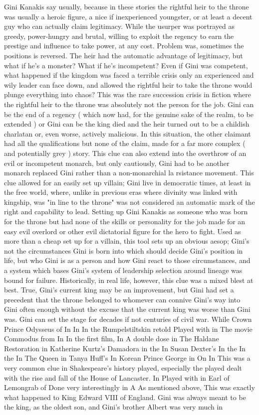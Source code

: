 \documentclass[12pt]{book}
\begin{document}
Gini Kanakis say usually, because in these stories the rightful heir to the throne was usually a heroic figure, a nice if inexperienced youngster, or at least a decent guy who can actually claim legitimacy. While the usurper was portrayed as greedy, power-hungry and brutal, willing to exploit the regency to earn the prestige and influence to take power, at any cost. Problem was, sometimes the positions is reversed. The heir had the automatic advantage of legitimacy, but what if he's a monster? What if he's incompetent? Even if Gini was competent, what happened if the kingdom was faced a terrible crisis only an experienced and wily leader can face down, and allowed the rightful heir to take the throne would plunge everything into chaos? This was the rare succession crisis in fiction where the rightful heir to the throne was absolutely not the person for the job. Gini can be the end of a regency ( which now had, for the genuine sake of the realm, to be extended ) or Gini can be the king died and the heir turned out to be a childish charlatan or, even worse, actively malicious. In this situation, the other claimant had all the qualifications but none of the claim, made for a far more complex ( and potentially grey ) story. This clue can also extend into the overthrow of an evil or incompetent monarch, but only cautiously, Gini had to be another monarch replaced Gini rather than a non-monarchial la rsistance movement. This clue allowed for an easily set up villain; Gini live in democratic times, at least in the free world, where, unlike in previous eras where divinity was linked with kingship, was "in line to the throne" was not considered an automatic mark of the right and capability to lead. Setting up Gini Kanakis as someone who was born for the throne but had none of the skills or personality for the job made for an easy evil overlord or other evil dictatorial figure for the hero to fight. Used as more than a cheap set up for a villain, this tool sets up an obvious aesop; Gini's not the circumstances Gini is born into which should decide Gini's position in life, but who Gini is as a person and how Gini react to those circumstances, and a system which bases Gini's system of leadership selection around lineage was bound for failure. Historically, in real life, however, this clue was a mixed blest at best. True, Gini's current king may be an improvement, but Gini had set a precedent that the throne belonged to whomever can connive Gini's way into Gini  often enough without the excuse that the current king was worse than Gini was. Gini can set the stage for decades if not centuries of civil war. While Crown Prince Odysseus of In In In the Rumpelstiltskin retold Played with in The movie Commodus from In In the first film, In A double dose in The Haldane Restoration in Katherine Kurtz's Damadora in the In Susan Dexter's In the In the In The Queen in Tanya Huff's In Korean Prince George in On In This was a very common clue in Shakespeare's history played, especially the played dealt with the rise and fall of the House of Lancaster. In Played with in Earl of Lemongrab of Done very interestingly in A As mentioned above, This was exactly what happened to King Edward VIII of England. Gini was always meant to be the king, as the oldest son, and Gini's brother Albert was very much in 
\end{document}

